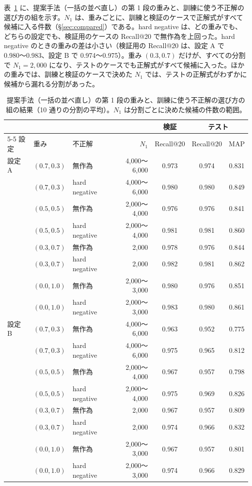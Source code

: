\documentclass[11pt,a4paper]{ltjsarticle}
\begin{document}
表~\ref{tab:stage1grid} に、提案手法（一括の並べ直し）の第 1 段の重みと、訓練に使う不正解の選び方の組を示す。$N_1$ は、重みごとに、訓練と検証のケースで正解式がすべて候補に入る件数（\S\ref{sec:compared}）である。hard negative は、どの重みでも、どちらの設定でも、検証用のケースの Recall@20 で無作為を上回った。hard negative のときの重みの差は小さい（検証用の Recall@20 は、設定 A で 0.980〜0.983、設定 B で 0.974〜0.975）。重み $(0.3, 0.7)$ だけが、すべての分割で $N_1 = 2{,}000$ になり、テストのケースでも正解式がすべて候補に入った。ほかの重みでは、訓練と検証のケースで決めた $N_1$ では、テストの正解式がわずかに候補から漏れる分割があった。

\begin{table}[h]\centering
\caption{提案手法（一括の並べ直し）の第 1 段の重みと、訓練に使う不正解の選び方の組の結果（10 通りの分割の平均）。$N_1$ は分割ごとに決めた候補の件数の範囲。}
\label{tab:stage1grid}
\footnotesize
\setlength{\tabcolsep}{2.5pt}
\begin{tabular}{@{}lllrccc@{}}
\toprule
 & & & & 検証 & \multicolumn{2}{c}{テスト} \\
\cmidrule{5-5}\cmidrule{6-7}
設定 & 重み & 不正解 & $N_1$ & Recall@20 & Recall@20 & MAP \\
\midrule
設定 A & $(0.7, 0.3)$ & 無作為 & 4{,}000〜6{,}000 & 0.973 & 0.974 & 0.831 \\
 & $(0.7, 0.3)$ & hard negative & 4{,}000〜6{,}000 & 0.980 & 0.980 & 0.849 \\
 & $(0.5, 0.5)$ & 無作為 & 2{,}000〜4{,}000 & 0.976 & 0.976 & 0.841 \\
 & $(0.5, 0.5)$ & hard negative & 2{,}000〜4{,}000 & 0.981 & 0.981 & 0.860 \\
 & $(0.3, 0.7)$ & 無作為 & 2{,}000 & 0.978 & 0.976 & 0.844 \\
 & $(0.3, 0.7)$ & hard negative & 2{,}000 & 0.982 & 0.981 & 0.862 \\
 & $(0.0, 1.0)$ & 無作為 & 2{,}000〜3{,}000 & 0.980 & 0.976 & 0.851 \\
 & $(0.0, 1.0)$ & hard negative & 2{,}000〜3{,}000 & 0.983 & 0.980 & 0.861 \\
\midrule
設定 B & $(0.7, 0.3)$ & 無作為 & 4{,}000〜6{,}000 & 0.963 & 0.952 & 0.775 \\
 & $(0.7, 0.3)$ & hard negative & 4{,}000〜6{,}000 & 0.975 & 0.965 & 0.812 \\
 & $(0.5, 0.5)$ & 無作為 & 2{,}000〜4{,}000 & 0.967 & 0.957 & 0.798 \\
 & $(0.5, 0.5)$ & hard negative & 2{,}000〜4{,}000 & 0.975 & 0.969 & 0.826 \\
 & $(0.3, 0.7)$ & 無作為 & 2{,}000 & 0.967 & 0.957 & 0.809 \\
 & $(0.3, 0.7)$ & hard negative & 2{,}000 & 0.974 & 0.966 & 0.832 \\
 & $(0.0, 1.0)$ & 無作為 & 2{,}000〜3{,}000 & 0.967 & 0.957 & 0.801 \\
 & $(0.0, 1.0)$ & hard negative & 2{,}000〜3{,}000 & 0.974 & 0.966 & 0.829 \\
\bottomrule
\end{tabular}
\end{table}
\end{document}
